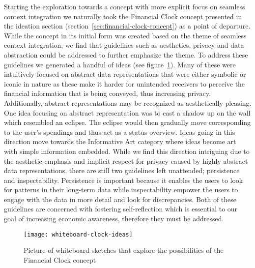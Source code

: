 Starting the exploration towards a concept with more explicit focus on seamless context integration we naturally took the Financial Clock concept presented in the ideation section (section~\ref{sec:financial-clock-concept}) as a point of departure. While the concept in its initial form was created based on the theme of seamless context integration, we find that guidelines such as aesthetics, privacy and data abstraction could be addressed to further emphasize the theme. To address these guidelines we generated a handful of ideas (see figure~\ref{fig:whiteboard-clock-ideas}). Many of these were intuitively focused on abstract data representations that were either symbolic or iconic in nature as these make it harder for unintended receivers to perceive the financial information that is being conveyed, thus increasing privacy. Additionally, abstract representations may be recognized as aesthetically pleasing. One idea focusing on abstract representation was to cast a shadow up on the wall which resembled an eclipse. The eclipse would then gradually move corresponding to the user’s spendings and thus act as a status overview. Ideas going in this direction move towards the Informative Art category where ideas become art with simple information embedded. While we find this direction intriguing due to the aesthetic emphasis and implicit respect for privacy caused by highly abstract data representations, there are still two guidelines left unattended; persistence and inspectability. Persistence is important because it enables the users to look for patterns in their long-term data while inspectability empower the users to engage with the data in more detail and look for discrepancies. Both of these guidelines are concerned with fostering self-reflection which is essential to our goal of increasing economic awareness, therefore they must be addressed.

\begin{figure}[h]
	\centering
	\texttt{[image: whiteboard-clock-ideas]}
	\caption{Picture of whiteboard sketches that explore the possibilities of the Financial Clock concept}
	\label{fig:whiteboard-clock-ideas}
\end{figure}

